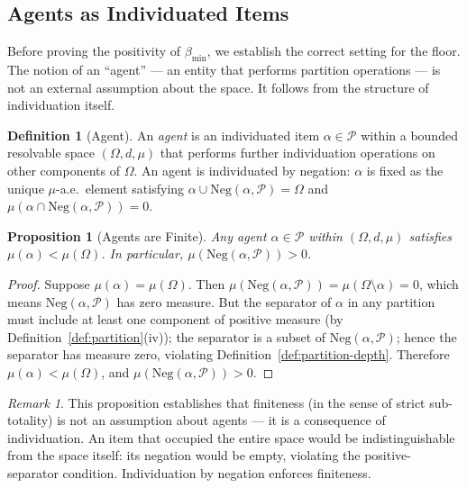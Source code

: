 \documentclass[12pt,a4paper,twocolumn]{article}
\theoremstyle{plain}
\newtheorem{proposition}[theorem]{Proposition}
\theoremstyle{definition}
\newtheorem{definition}[theorem]{Definition}
\theoremstyle{remark}
\newtheorem{remark}[theorem]{Remark}
\newcommand{\Part}{\mathcal{P}}
\newcommand{\bmin}{\beta_{\min}}
\newcommand{\Neg}{\mathrm{Neg}}
\newcommand{\BRS}{(\Omega,d,\mu)}
\begin{document}
\subsection{Agents as Individuated Items}

Before proving the positivity of $\bmin$, we establish the correct setting
for the floor.  The notion of an ``agent'' --- an entity that performs
partition operations --- is not an external assumption about the space.  It
follows from the structure of individuation itself.

\begin{definition}[Agent]
\label{def:agent}
An \emph{agent} is an individuated item $\alpha \in \Part$ within a bounded
resolvable space $\BRS$ that performs further individuation operations on
other components of $\Omega$.  An agent is individuated by negation:
$\alpha$ is fixed as the unique $\mu$-a.e.\ element satisfying
$\alpha \cup \Neg(\alpha, \Part) = \Omega$ and $\mu(\alpha \cap
\Neg(\alpha, \Part)) = 0$.
\end{definition}

\begin{proposition}[Agents are Finite]
\label{prop:agents-finite}
Any agent $\alpha \in \Part$ within $\BRS$ satisfies $\mu(\alpha) < \mu(\Omega)$.
In particular, $\mu(\Neg(\alpha, \Part)) > 0$.
\end{proposition}

\begin{proof}
Suppose $\mu(\alpha) = \mu(\Omega)$.  Then $\mu(\Neg(\alpha, \Part)) =
\mu(\Omega \setminus \alpha) = 0$, which means $\Neg(\alpha, \Part)$ has
zero measure.  But the separator of $\alpha$ in any partition must include
at least one component of positive measure (by Definition~\ref{def:partition}(iv));
the separator is a subset of $\Neg(\alpha, \Part)$; hence the separator has
measure zero, violating Definition~\ref{def:partition-depth}.  Therefore
$\mu(\alpha) < \mu(\Omega)$, and $\mu(\Neg(\alpha, \Part)) > 0$.
\end{proof}

\begin{remark}
This proposition establishes that finiteness (in the sense of strict
sub-totality) is not an assumption about agents --- it is a consequence of
individuation.  An item that occupied the entire space would be
indistinguishable from the space itself: its negation would be empty,
violating the positive-separator condition.  Individuation by negation
enforces finiteness.
\end{remark}
\end{document}
